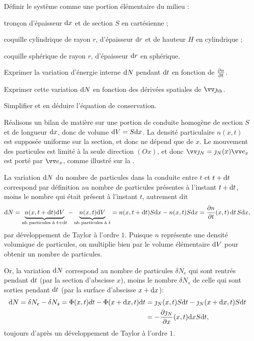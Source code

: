 \documentclass[12pt,fancy]{cours}
\begin{document}
\begin{methode}
  \item Définir le système comme une portion élémentaire du milieu :
  \begin{liste}
    \item tronçon d'épaisseur $\mathrm{d} x$ et de section $S$ en cartésienne ;
    \item coquille cylindrique de rayon $r$, d'épaisseur $\mathrm{d} r$ et de hauteur $H$ en cylindrique ;
    \item coquille sphérique de rayon $r$, d'épaisseur $\mathrm{d} r$ en sphérique.
  \end{liste}
  \item Exprimer la variation d'énergie interne $\mathrm{d} N$ pendant $\mathrm{d} t$ en fonction de $\frac{\partial{n}}{\partial{t}}$.
  \item Exprimer cette variation $\mathrm{d} N$ en fonction des dérivées spatiales de $\Vec{\jth}$.
  \item Simplifier et en déduire l'équation de conservation.
\end{methode}


 Réalisons un bilan de matière sur une portion de conduite homogène de section $S$ et de longueur $\mathrm{d} x$, donc de volume $\mathrm{d} V = S\mathrm{d} x$. La densité particulaire  $n(x,t)$ est supposée uniforme sur la section, et donc ne dépend que de $x$. Le mouvement des particules est limité à la seule direction $(Ox)$, et donc $\Vec{\jN} = \jN(x) \ex$ est porté par $\ex$, comme illustré sur la .

La variation $\mathrm{d} N$ du nombre de particules dans la conduite entre $t$ et $t+\mathrm{d} t$ correspond par définition au nombre de particules présentes à l'instant $t+\mathrm{d} t$, moins le nombre qui était présent à l'instant $t$, autrement dit
\begin{equation}
\label{eq:etablissement_eq_diffusion_bilan1}
\mathrm{d} N = \underbrace{n(x,t+\mathrm{d} t)\mathrm{d} V}_{\text{nb particules à } t + \mathrm{d} t} -\underbrace{n(x,t)\mathrm{d} V}_{\text{nb particules à } t} =n(x,t+\mathrm{d} t)S\mathrm{d} x-n(x,t)S\mathrm{d} x=\frac{\partial n}{\partial t}(x,t)\,\mathrm{d} t\,S\mathrm{d} x,
\end{equation}
par développement de Taylor à l’ordre $1$.
Puisque $n$ représente une densité volumique de particules, on multiplie bien par le volume élémentaire $\mathrm{d} V$ pour obtenir un nombre de particules.

Or, la variation $\mathrm{d} N$ correspond au nombre de particules $\delta N_e$ qui sont rentrés pendant $\mathrm{d} t$ (par la section d'abscisse $x$), moins le nombre $\delta N_s$ de celle qui sont sorties pendant $\mathrm{d} t$ (par la surface d'abscisse $x+\mathrm{d} x$):
\begin{align}
\label{eq:etablissement_eq_diffusion_bilan2}
\nonumber
\mathrm{d} N = \delta N_e - \delta N_s = \Phi(x,t)d t-\Phi(x+\mathrm{d} x,t)  \mathrm{d} t
&=\jmath_N(x,t) S \mathrm{d} t- \jmath_N(x+\mathrm{d} x,t) S\mathrm{d} t\\
& =-\frac{\partial \jmath_N}{\partial x}(x,t) \mathrm{d} x S\mathrm{d} t,
\end{align}
toujours d’après un développement de Taylor à l’ordre $1$.
\end{document}
